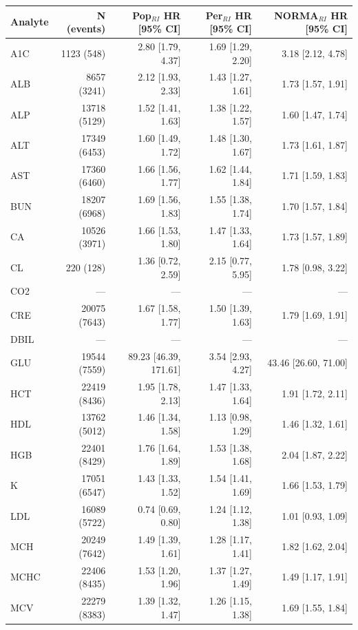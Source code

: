 \begin{table}[ht]
\centering
\footnotesize
\begin{tabular}{lrrrr}
\toprule
Analyte & N (events) & Pop$_{RI}$ HR [95\% CI] & Per$_{RI}$ HR [95\% CI] & NORMA$_{RI}$ HR [95\% CI] \\
\midrule
A1C & 1123 (548) & 2.80 [1.79, 4.37] & 1.69 [1.29, 2.20] & 3.18 [2.12, 4.78] \\
ALB & 8657 (3241) & 2.12 [1.93, 2.33] & 1.43 [1.27, 1.61] & 1.73 [1.57, 1.91] \\
ALP & 13718 (5129) & 1.52 [1.41, 1.63] & 1.38 [1.22, 1.57] & 1.60 [1.47, 1.74] \\
ALT & 17349 (6453) & 1.60 [1.49, 1.72] & 1.48 [1.30, 1.67] & 1.73 [1.61, 1.87] \\
AST & 17360 (6460) & 1.66 [1.56, 1.77] & 1.62 [1.44, 1.84] & 1.71 [1.59, 1.83] \\
BUN & 18207 (6968) & 1.69 [1.56, 1.83] & 1.55 [1.38, 1.74] & 1.70 [1.57, 1.84] \\
CA & 10526 (3971) & 1.66 [1.53, 1.80] & 1.47 [1.33, 1.64] & 1.73 [1.57, 1.89] \\
CL & 220 (128) & 1.36 [0.72, 2.59] & 2.15 [0.77, 5.95] & 1.78 [0.98, 3.22] \\
CO2 & --- & --- & --- & --- \\
CRE & 20075 (7643) & 1.67 [1.58, 1.77] & 1.50 [1.39, 1.63] & 1.79 [1.69, 1.91] \\
DBIL & --- & --- & --- & --- \\
GLU & 19544 (7559) & 89.23 [46.39, 171.61] & 3.54 [2.93, 4.27] & 43.46 [26.60, 71.00] \\
HCT & 22419 (8436) & 1.95 [1.78, 2.13] & 1.47 [1.33, 1.64] & 1.91 [1.72, 2.11] \\
HDL & 13762 (5012) & 1.46 [1.34, 1.58] & 1.13 [0.98, 1.29] & 1.46 [1.32, 1.61] \\
HGB & 22401 (8429) & 1.76 [1.64, 1.89] & 1.53 [1.38, 1.68] & 2.04 [1.87, 2.22] \\
K & 17051 (6547) & 1.43 [1.33, 1.52] & 1.54 [1.41, 1.69] & 1.66 [1.53, 1.79] \\
LDL & 16089 (5722) & 0.74 [0.69, 0.80] & 1.24 [1.12, 1.38] & 1.01 [0.93, 1.09] \\
MCH & 20249 (7642) & 1.49 [1.39, 1.61] & 1.28 [1.17, 1.41] & 1.82 [1.62, 2.04] \\
MCHC & 22406 (8435) & 1.53 [1.20, 1.96] & 1.37 [1.27, 1.49] & 1.49 [1.17, 1.91] \\
MCV & 22279 (8383) & 1.39 [1.32, 1.47] & 1.26 [1.15, 1.38] & 1.69 [1.55, 1.84] \\

\end{tabular}
\end{table}
